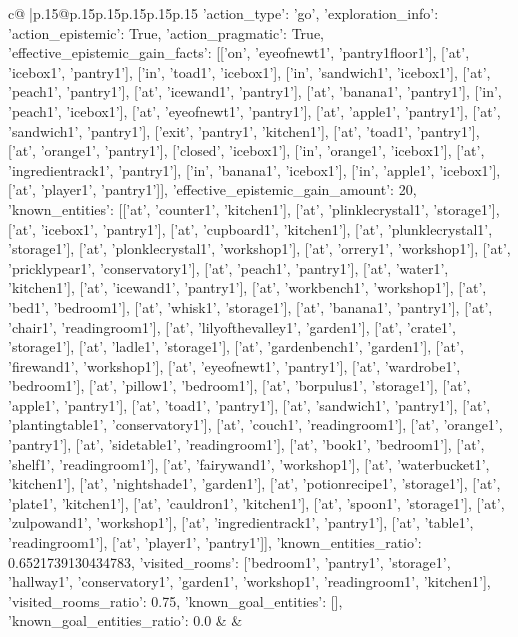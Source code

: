 \documentclass{article}
\begin{document}
{\begin{supertabular}{c@{$\;$}|p{.15\linewidth}@{}p{.15\linewidth}p{.15\linewidth}p{.15\linewidth}p{.15\linewidth}p{.15\linewidth}}
{{{	 {'action_type': 'go', 'exploration_info': {'action_epistemic': True, 'action_pragmatic': True, 'effective_epistemic_gain_facts': [['on', 'eyeofnewt1', 'pantry1floor1'], ['at', 'icebox1', 'pantry1'], ['in', 'toad1', 'icebox1'], ['in', 'sandwich1', 'icebox1'], ['at', 'peach1', 'pantry1'], ['at', 'icewand1', 'pantry1'], ['at', 'banana1', 'pantry1'], ['in', 'peach1', 'icebox1'], ['at', 'eyeofnewt1', 'pantry1'], ['at', 'apple1', 'pantry1'], ['at', 'sandwich1', 'pantry1'], ['exit', 'pantry1', 'kitchen1'], ['at', 'toad1', 'pantry1'], ['at', 'orange1', 'pantry1'], ['closed', 'icebox1'], ['in', 'orange1', 'icebox1'], ['at', 'ingredientrack1', 'pantry1'], ['in', 'banana1', 'icebox1'], ['in', 'apple1', 'icebox1'], ['at', 'player1', 'pantry1']], 'effective_epistemic_gain_amount': 20, 'known_entities': [['at', 'counter1', 'kitchen1'], ['at', 'plinklecrystal1', 'storage1'], ['at', 'icebox1', 'pantry1'], ['at', 'cupboard1', 'kitchen1'], ['at', 'plunklecrystal1', 'storage1'], ['at', 'plonklecrystal1', 'workshop1'], ['at', 'orrery1', 'workshop1'], ['at', 'pricklypear1', 'conservatory1'], ['at', 'peach1', 'pantry1'], ['at', 'water1', 'kitchen1'], ['at', 'icewand1', 'pantry1'], ['at', 'workbench1', 'workshop1'], ['at', 'bed1', 'bedroom1'], ['at', 'whisk1', 'storage1'], ['at', 'banana1', 'pantry1'], ['at', 'chair1', 'readingroom1'], ['at', 'lilyofthevalley1', 'garden1'], ['at', 'crate1', 'storage1'], ['at', 'ladle1', 'storage1'], ['at', 'gardenbench1', 'garden1'], ['at', 'firewand1', 'workshop1'], ['at', 'eyeofnewt1', 'pantry1'], ['at', 'wardrobe1', 'bedroom1'], ['at', 'pillow1', 'bedroom1'], ['at', 'borpulus1', 'storage1'], ['at', 'apple1', 'pantry1'], ['at', 'toad1', 'pantry1'], ['at', 'sandwich1', 'pantry1'], ['at', 'plantingtable1', 'conservatory1'], ['at', 'couch1', 'readingroom1'], ['at', 'orange1', 'pantry1'], ['at', 'sidetable1', 'readingroom1'], ['at', 'book1', 'bedroom1'], ['at', 'shelf1', 'readingroom1'], ['at', 'fairywand1', 'workshop1'], ['at', 'waterbucket1', 'kitchen1'], ['at', 'nightshade1', 'garden1'], ['at', 'potionrecipe1', 'storage1'], ['at', 'plate1', 'kitchen1'], ['at', 'cauldron1', 'kitchen1'], ['at', 'spoon1', 'storage1'], ['at', 'zulpowand1', 'workshop1'], ['at', 'ingredientrack1', 'pantry1'], ['at', 'table1', 'readingroom1'], ['at', 'player1', 'pantry1']], 'known_entities_ratio': 0.6521739130434783, 'visited_rooms': ['bedroom1', 'pantry1', 'storage1', 'hallway1', 'conservatory1', 'garden1', 'workshop1', 'readingroom1', 'kitchen1'], 'visited_rooms_ratio': 0.75, 'known_goal_entities': [], 'known_goal_entities_ratio': 0.0}} 
	  } 
	   } 
	   } 
	 & & \\ 
 


\end{supertabular}}
\end{document}
